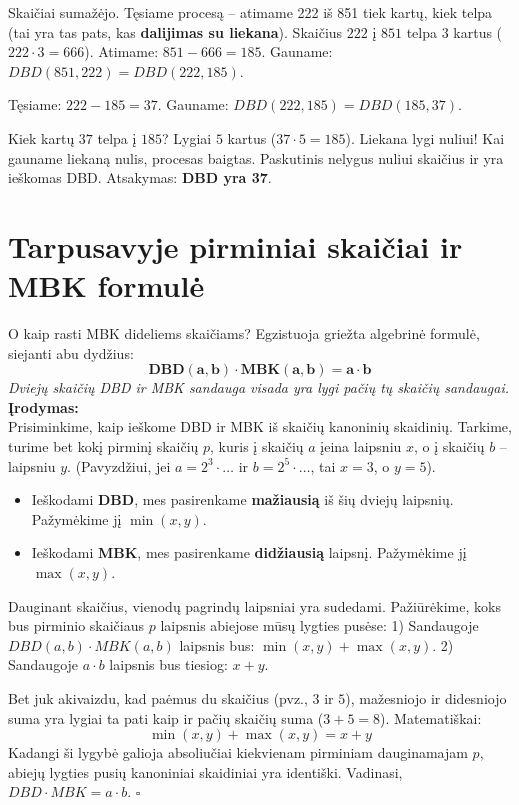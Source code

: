 \documentclass[11pt,a4paper]{scrartcl}
\begin{document}
Skaičiai sumažėjo. Tęsiame procesą – atimame 222 iš 851 tiek kartų, kiek telpa (tai yra tas pats, kas \textbf{dalijimas su liekana}).
Skaičius $222$ į $851$ telpa $3$ kartus ($222 \cdot 3 = 666$). Atimame: $851 - 666 = 185$.
Gauname: $DBD(851, 222) = DBD(222, 185)$.

Tęsiame: $222 - 185 = 37$.
Gauname: $DBD(222, 185) = DBD(185, 37)$.

Kiek kartų $37$ telpa į $185$? Lygiai $5$ kartus ($37 \cdot 5 = 185$). Liekana lygi nuliui!
Kai gauname liekaną nulis, procesas baigtas. Paskutinis nelygus nuliui skaičius ir yra ieškomas DBD.
Atsakymas: \textbf{DBD yra 37}.

\section{Tarpusavyje pirminiai skaičiai ir MBK formulė}

O kaip rasti MBK dideliems skaičiams? Egzistuoja griežta algebrinė formulė, siejanti abu dydžius:
\[ \mathbf{DBD(a, b) \cdot MBK(a, b) = a \cdot b} \]
\textit{Dviejų skaičių DBD ir MBK sandauga visada yra lygi pačių tų skaičių sandaugai.}
\textbf{Įrodymas:}\\
Prisiminkime, kaip ieškome DBD ir MBK iš skaičių kanoninių skaidinių. Tarkime, turime bet kokį pirminį skaičių $p$, kuris į skaičių $a$ įeina laipsniu $x$, o į skaičių $b$ – laipsniu $y$. 
(Pavyzdžiui, jei $a = 2^3 \cdot \dots$ ir $b = 2^5 \cdot \dots$, tai $x=3$, o $y=5$).

\begin{itemize}
    \item Ieškodami \textbf{DBD}, mes pasirenkame \textbf{mažiausią} iš šių dviejų laipsnių. Pažymėkime jį $\min(x, y)$.
    \item Ieškodami \textbf{MBK}, mes pasirenkame \textbf{didžiausią} laipsnį. Pažymėkime jį $\max(x, y)$.
\end{itemize}

Dauginant skaičius, vienodų pagrindų laipsniai yra sudedami.
Pažiūrėkime, koks bus pirminio skaičiaus $p$ laipsnis abiejose mūsų lygties pusėse:
1) Sandaugoje $DBD(a,b) \cdot MBK(a,b)$ laipsnis bus: $\min(x, y) + \max(x, y)$.
2) Sandaugoje $a \cdot b$ laipsnis bus tiesiog: $x + y$.

Bet juk akivaizdu, kad paėmus du skaičius (pvz., $3$ ir $5$), mažesniojo ir didesniojo suma yra lygiai ta pati kaip ir pačių skaičių suma ($3 + 5 = 8$). Matematiškai: 
\[ \min(x, y) + \max(x, y) = x + y \]
Kadangi ši lygybė galioja absoliučiai kiekvienam pirminiam dauginamajam $p$, abiejų lygties pusių kanoniniai skaidiniai yra identiški. Vadinasi, $DBD \cdot MBK = a \cdot b$. \hfill $\square$
\end{document}
